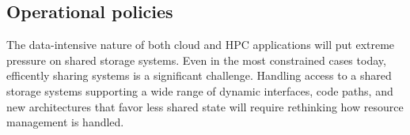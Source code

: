 \documentclass{sig-alternate-05-2015}
\begin{document}
\subsection{Operational policies}

The data-intensive nature of both cloud and HPC applications will put extreme
pressure on shared storage systems. Even in the most constrained cases today,
efficently sharing systems is a significant challenge. Handling access to a
shared storage systems supporting a wide range of dynamic interfaces, code
paths, and new architectures that favor less shared state will require
rethinking how resource management is handled.

%

\end{document}
